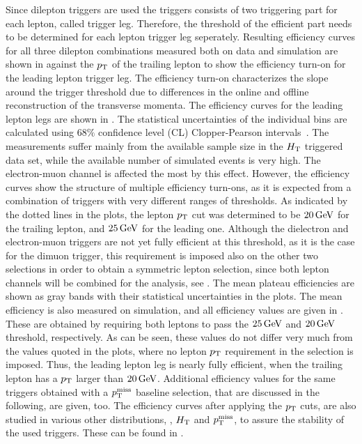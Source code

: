 Since dilepton triggers are used the triggers consists of two triggering part for each lepton, called trigger leg. Therefore, the threshold of the efficient part needs to be determined for each lepton trigger leg seperately. Resulting efficiency curves for all three dilepton combinations measured both on data and simulation are shown in  against the $p_{\mathrm{T}}$ of the trailing lepton to show the efficiency turn-on for the leading lepton trigger leg. The efficiency turn-on characterizes the slope around the trigger threshold due to differences in the online and offline reconstruction of the transverse momenta. The efficiency curves for the leading lepton legs are shown in . The statistical uncertainties of the individual bins are calculated using $68\%$ confidence level (CL) Clopper-Pearson intervals~\cite{ClopperPearson}. The measurements suffer mainly from the available sample size in the $H_{\mathrm{T}}$ triggered data set, while the available number of simulated events is very high. The electron-muon channel is affected the most by this effect. However, the efficiency curves show the structure of multiple efficiency turn-ons, as it is expected from a combination of triggers with very different ranges of thresholds. As indicated by the dotted lines in the plots, the lepton $p_{\mathrm{T}}$ cut was determined to be $20\,\text{Ge\hspace{-.08em}V}$ for the trailing lepton, and $25\,\text{Ge\hspace{-.08em}V}$ for the leading one. Although the dielectron and electron-muon triggers are not yet fully efficient at this threshold, as it is the case for the dimuon trigger, this requirement is imposed also on the other two selections in order to obtain a symmetric lepton selection, since both lepton channels will be combined for the analysis, see . The mean plateau efficiencies are shown as gray bands with their statistical uncertainties in the plots. The mean efficiency is also measured on simulation, and all efficiency values are given in . These are obtained by requiring both leptons to pass the $25\,\text{Ge\hspace{-.08em}V}$ and $20\,\text{Ge\hspace{-.08em}V}$ threshold, respectively. As can be seen, these values do not differ very much from the values quoted in the plots, where no lepton $p_{\mathrm{T}}$ requirement in the selection is imposed. Thus, the leading lepton leg is nearly fully efficient, when the trailing lepton has a $p_{\mathrm{T}}$ larger than $20\,\text{Ge\hspace{-.08em}V}$. Additional efficiency values for the same triggers obtained with a $p_{\mathrm{T}}^\text{miss}$ baseline selection, that are discussed in the following, are given, too.
The efficiency curves after applying the $p_{\mathrm{T}}$ cuts, are also studied in various other distributions, \eg, $H_{\mathrm{T}}$ and $p_{\mathrm{T}}^\text{miss}$, to assure the stability of the used triggers. These can be found in  .
